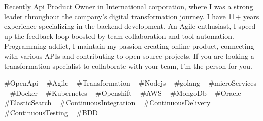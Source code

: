 

\begin{cvparagraph}

Recently Api Product Owner in International corporation, where I was a strong leader throughout the company's digital transformation journey. I have 11+ years experience specializing in the backend development.
An Agile enthusiast, I speed up the feedback loop boosted by team collaboration and tool automation.
Programming addict, I maintain my passion creating online product, connecting with various APIs and contributing to open source projects. If you are looking a transformation specialist to collaborate with your team, I'm the person for you.

\end{cvparagraph}
\begin{cvtechnologies}
 \#OpenApi ~
 \#Agile ~
 \#Transformation ~
 \#Nodejs ~
 \#golang ~
 \#microServices ~
 \#Docker ~
 \#Kubernetes ~
 \#Openshift ~
 \#AWS ~
 \#MongoDb ~
 \#Oracle ~
 \#ElasticSearch ~
 \#ContinuousIntegration ~
 \#ContinuousDelivery ~
 \#ContinuousTesting ~
 \#BDD 
\end{cvtechnologies}
